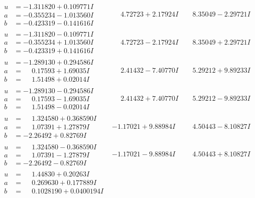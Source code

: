 \documentclass[1p]{elsarticle_modified}
\theoremstyle{definition}
\begin{document}
$$\begin{array}{c|c|c}
\begin{aligned}
u &= -1.311820 + 0.109771 I \\
a &= -0.355234 - 1.013560 I \\
b &= -0.423319 - 0.141616 I\end{aligned}
 & \phantom{-}4.72723 + 2.17924 I & \phantom{-}8.35049 - 2.29721 I \\ \hline\begin{aligned}
u &= -1.311820 - 0.109771 I \\
a &= -0.355234 + 1.013560 I \\
b &= -0.423319 + 0.141616 I\end{aligned}
 & \phantom{-}4.72723 - 2.17924 I & \phantom{-}8.35049 + 2.29721 I \\ \hline\begin{aligned}
u &= -1.289130 + 0.294586 I \\
a &= \phantom{-}0.17593 + 1.69035 I \\
b &= \phantom{-}1.51498 + 0.02014 I\end{aligned}
 & \phantom{-}2.41432 - 7.40770 I & \phantom{-}5.29212 + 9.89233 I \\ \hline\begin{aligned}
u &= -1.289130 - 0.294586 I \\
a &= \phantom{-}0.17593 - 1.69035 I \\
b &= \phantom{-}1.51498 - 0.02014 I\end{aligned}
 & \phantom{-}2.41432 + 7.40770 I & \phantom{-}5.29212 - 9.89233 I \\ \hline\begin{aligned}
u &= \phantom{-}1.324580 + 0.368590 I \\
a &= \phantom{-}1.07391 + 1.27879 I \\
b &= -2.26492 + 0.82769 I\end{aligned}
 & -1.17021 + 9.88984 I & \phantom{-}4.50443 - 8.10827 I \\ \hline\begin{aligned}
u &= \phantom{-}1.324580 - 0.368590 I \\
a &= \phantom{-}1.07391 - 1.27879 I \\
b &= -2.26492 - 0.82769 I\end{aligned}
 & -1.17021 - 9.88984 I & \phantom{-}4.50443 + 8.10827 I \\ \hline\begin{aligned}
u &= \phantom{-}1.44830 + 0.20263 I \\
a &= \phantom{-}0.269630 + 0.177889 I \\
b &= \phantom{-}0.1028190 + 0.0400194 I\end{aligned}

\end{array}$$
\end{document}
